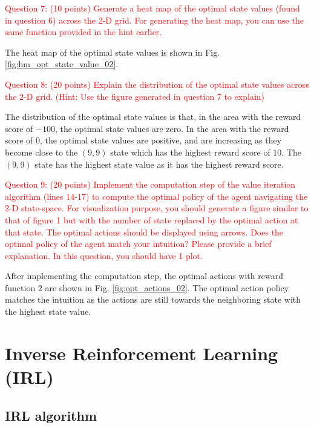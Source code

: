 \documentclass[11pt]{article}
\begin{document}
\textcolor{red}{
    Question 7: (10 points) Generate a heat map of the optimal state values (found in question 6) across the 2-D grid. For generating the heat map, you can use the same function provided in the hint earlier.
}

The heat map of the optimal state values is shown in Fig. \ref{fig:hm_opt_state_value_02}.
\vspace{10pt}

\textcolor{red}{
    Question 8: (20 points) Explain the distribution of the optimal state values across the 2-D grid. (Hint: Use the figure generated in question 7 to explain)
}

The distribution of the optimal state values is that, in the area with the reward score of $-100$, the optimal state values are zero. In the area with the reward score of $0$, the optimal state values are positive, and are increasing as they become close to the $(9,9)$ state which has the highest reward score of $10$. The $(9,9)$ state has the highest state value as it has the highest reward score.

\textcolor{red}{
    Question 9: (20 points) Implement the computation step of the value iteration algorithm (lines 14-17) to compute the optimal policy of the agent navigating the 2-D state-space. For visualization purpose, you should generate a figure
similar to that of figure 1 but with the number of state replaced by the optimal action at that state. The optimal actions should be displayed using arrows. Does the optimal policy of the agent match your intuition? Please provide a
brief explanation. In this question, you should have 1 plot.
}

After implementing the computation step, the optimal actions with reward function $2$ are shown in Fig. \ref{fig:opt_actions_02}. The optimal action policy matches the intuition as the actions are still towards the neighboring state with the highest state value.









\section{Inverse Reinforcement Learning (IRL)}

\subsection{IRL algorithm}
\end{document}
